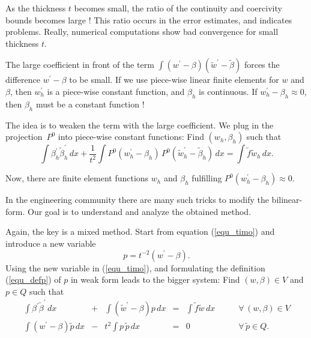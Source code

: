 As the thickness $t$ becomes small, the ratio of the continuity and coercivity 
bounds becomes large ! This ratio occurs in the error estimates, and indicates 
problems. Really, numerical computations show bad convergence for small thickness $t$.

The large coefficient in front of the term $\int (w^\prime - \beta) (\tilde w^\prime - \tilde \beta)$ forces the difference $w^\prime - \beta$ to be small. If we use piece-wise linear
finite elements for $w$ and $\beta$, then $w_h^\prime$ is a piece-wise constant function,
and $\beta_h$ is continuous. If $w_h^\prime - \beta_h \approx 0$, then $\beta_h$ must
be a constant function !

\bigskip

The idea is to weaken the term with the large coefficient. We plug in the 
projection~$P^0$ into piece-wise constant functions: Find $(w_h, \beta_h)$ such that
\begin{equation} \label{equ_timo_h}
\int \beta_h^\prime \tilde \beta_h^\prime \, dx + \frac{1}{t^2} \int P^0 (w_h^\prime - \beta_h) \, P^0 (\tilde w_h^\prime - \tilde \beta_h) \, dx = \int \tilde f \tilde w_h \, dx.
\end{equation}

Now, there are finite element functions $w_h$ and $\beta_h$ fulfilling $P^0 (w_h^\prime - \beta_h) \approx 0$. 

In the engineering community there are many such tricks to modify the bilinear-form.
Our goal is to understand and analyze the obtained method. 


\bigskip

Again, the key is a mixed method. Start from equation (\ref{equ_timo}) and introduce a
new variable
\begin{equation} \label{equ_defp}
p = t^{-2} (w^\prime - \beta).
\end{equation}
Using the new variable in (\ref{equ_timo}), and formulating the definition (\ref{equ_defp})
of $p$ in weak form
leads to the bigger system: Find $(w,\beta) \in V$ and $p \in Q$ such that
\begin{equation} \label{equ_timo_mixed}
\begin{array}{ccccll}
\int \beta^\prime \tilde \beta^\prime \, dx & + & \int (\tilde w^\prime - \beta) p \, dx & = &
\int \tilde f \tilde w \, dx \qquad & \forall \, (w,\beta) \in V  \\[0.5em]
\int (w^\prime - \beta) \tilde p \, dx & - & t^2 \int p \, \tilde p \, dx & = & 0 & 
\forall \, \tilde p \in Q.
\end{array}
\end{equation}

